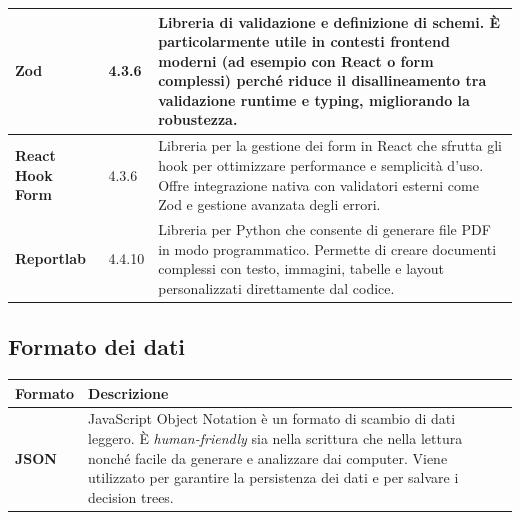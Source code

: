 \documentclass[a4paper,12pt]{article}
\begin{document}
\begin{center}
\begin{tabularx}{\textwidth}{|l|l|X|}
                \textbf{Zod} & 4.3.6 & Libreria di validazione e definizione di schemi. È particolarmente utile in contesti frontend moderni (ad esempio con React o form complessi) perché riduce il disallineamento tra validazione runtime e typing, migliorando la robustezza. \\
                \hline
                \textbf{React Hook Form} & 4.3.6 & Libreria per la gestione dei form in React che sfrutta gli hook per ottimizzare performance e semplicità d'uso. Offre integrazione nativa con validatori esterni come Zod e gestione avanzata degli errori. \\
                \hline
                \textbf{Reportlab} & 4.4.10 & Libreria per Python che consente di generare file PDF in modo programmatico. Permette di creare documenti complessi con testo, immagini, tabelle e layout personalizzati direttamente dal codice.   \\
                \hline
            \end{tabularx}
        \end{center}


        \subsection{Formato dei dati}
        \begin{center}
            \begin{tabularx}{\textwidth}{|l|X|}
                \hline
                \rowcolor{gold}
                \textbf{Formato} & \textbf{Descrizione}  \\
                \hline
                \textbf{JSON} & JavaScript Object Notation è un formato di scambio di dati leggero. È \textit{human-friendly} sia nella scrittura che nella lettura nonché facile da generare e analizzare dai computer. Viene utilizzato per garantire la persistenza dei dati e per salvare i decision trees.\\ 
                \hline
            \end{tabularx}
        \end{center}
\end{document}
